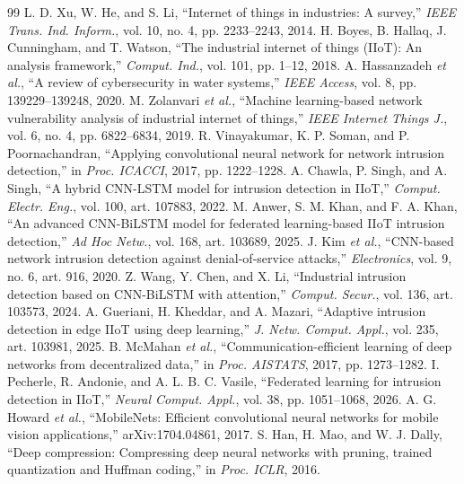 \documentclass[preprint,12pt]{elsarticle}
\begin{document}
\begin{thebibliography}{99}
 L. D. Xu, W. He, and S. Li, ``Internet of things in industries: A survey,'' \textit{IEEE Trans. Ind. Inform.}, vol. 10, no. 4, pp. 2233--2243, 2014.
 H. Boyes, B. Hallaq, J. Cunningham, and T. Watson, ``The industrial internet of things (IIoT): An analysis framework,'' \textit{Comput. Ind.}, vol. 101, pp. 1--12, 2018.
 A. Hassanzadeh \textit{et al.}, ``A review of cybersecurity in water systems,'' \textit{IEEE Access}, vol. 8, pp. 139229--139248, 2020.
 M. Zolanvari \textit{et al.}, ``Machine learning-based network vulnerability analysis of industrial internet of things,'' \textit{IEEE Internet Things J.}, vol. 6, no. 4, pp. 6822--6834, 2019.
 R. Vinayakumar, K. P. Soman, and P. Poornachandran, ``Applying convolutional neural network for network intrusion detection,'' in \textit{Proc. ICACCI}, 2017, pp. 1222--1228.
 A. Chawla, P. Singh, and A. Singh, ``A hybrid CNN-LSTM model for intrusion detection in IIoT,'' \textit{Comput. Electr. Eng.}, vol. 100, art. 107883, 2022.
 M. Anwer, S. M. Khan, and F. A. Khan, ``An advanced CNN-BiLSTM model for federated learning-based IIoT intrusion detection,'' \textit{Ad Hoc Netw.}, vol. 168, art. 103689, 2025.
 J. Kim \textit{et al.}, ``CNN-based network intrusion detection against denial-of-service attacks,'' \textit{Electronics}, vol. 9, no. 6, art. 916, 2020.
 Z. Wang, Y. Chen, and X. Li, ``Industrial intrusion detection based on CNN-BiLSTM with attention,'' \textit{Comput. Secur.}, vol. 136, art. 103573, 2024.
 A. Gueriani, H. Kheddar, and A. Mazari, ``Adaptive intrusion detection in edge IIoT using deep learning,'' \textit{J. Netw. Comput. Appl.}, vol. 235, art. 103981, 2025.
 B. McMahan \textit{et al.}, ``Communication-efficient learning of deep networks from decentralized data,'' in \textit{Proc. AISTATS}, 2017, pp. 1273--1282.
 I. Pecherle, R. Andonie, and A. L. B. C. Vasile, ``Federated learning for intrusion detection in IIoT,'' \textit{Neural Comput. Appl.}, vol. 38, pp. 1051--1068, 2026.
 A. G. Howard \textit{et al.}, ``MobileNets: Efficient convolutional neural networks for mobile vision applications,'' arXiv:1704.04861, 2017.
 S. Han, H. Mao, and W. J. Dally, ``Deep compression: Compressing deep neural networks with pruning, trained quantization and Huffman coding,'' in \textit{Proc. ICLR}, 2016.

\end{thebibliography}
\end{document}
